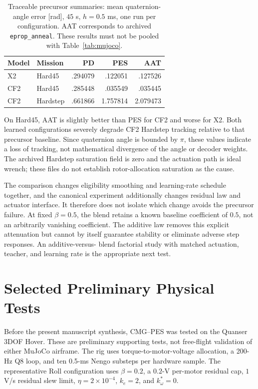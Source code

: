 \documentclass[letterpaper,10pt,conference]{IEEEtran}
\begin{document}
\begin{table}[t]
\caption{Traceable precursor summaries: mean quaternion-angle error [rad],
$45$ s, $h=0.5$ ms, one run per configuration. AAT corresponds to archived
\texttt{eprop\_anneal}. These results must not be pooled with
Table~\ref{tab:mujoco}.}
\label{tab:aat}\centering\small
\begin{tabular}{llrrr}
\toprule
Model&Mission&PD&PES&AAT\\\midrule
X2&Hard45&.294079&.122051&.127526\\
CF2&Hard45&.285448&.035549&.035445\\
CF2&Hardstep&.661866&1.757814&2.079473\\\bottomrule
\end{tabular}
\end{table}
On Hard45, AAT is slightly better than PES for CF2 and worse for X2.
Both learned configurations severely degrade CF2 Hardstep tracking relative
to that precursor baseline. Since quaternion angle is bounded by $\pi$,
these values indicate a loss of tracking, not mathematical divergence of
the angle or decoder weights. The archived Hardstep saturation field is
zero and the actuation path is ideal wrench; these files do not establish
rotor-allocation saturation as the cause.

The comparison changes eligibility smoothing and learning-rate schedule
together, and the canonical experiment additionally changes residual law
and actuator interface. It therefore does not isolate which change avoids
the precursor failure. At fixed $\beta=0.5$, the blend retains a known
baseline coefficient of $0.5$, not an arbitrarily vanishing coefficient.
The additive law removes this explicit attenuation but cannot by itself
guarantee stability or eliminate adverse step responses. An additive-versus-
blend factorial study with matched actuation, teacher, and learning rate
is the appropriate next test.

\section{Selected Preliminary Physical Tests}
\label{sec:hover}
Before the present manuscript synthesis, CMG--PES was tested on the
Quanser 3DOF Hover. These are preliminary supporting tests, not free-flight
validation of either MuJoCo airframe. The rig uses torque-to-motor-voltage
allocation, a 200-Hz Q8 loop, and ten 0.5-ms Nengo substeps per hardware
sample. The representative Roll configuration uses $\beta=0.2$, a
$0.2$-V per-motor residual cap, $1$ V/s residual slew limit,
$\eta=2\times10^{-4}$, $k_e=2$, and $k_\omega^*=0$.
\end{document}
